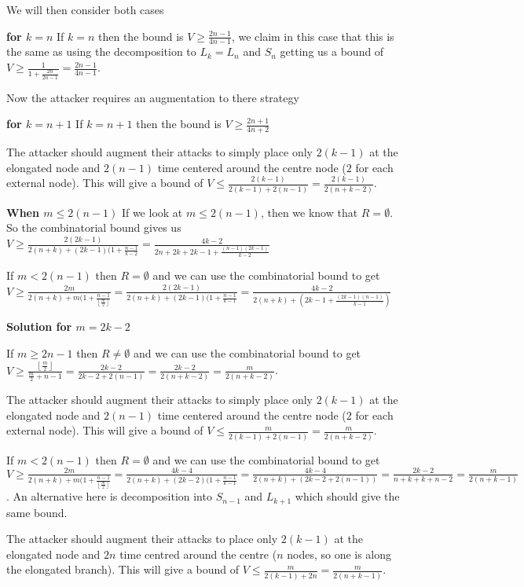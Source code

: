 \documentclass[a4paper,10pt]{article}
\newcommand{\floor}[1]{\left \lfloor #1 \right \rfloor}
\theoremstyle{definition}
\theoremstyle{definition}
\theoremstyle{remark}
\theoremstyle{definition}
\begin{document}
We will then consider both cases

\textbf{for $k=n$}
If $k=n$ then the bound is $V \geq \frac{2n-1}{4n-1}$, we claim in this case that this is the same as using the decomposition to $L_{k}=L_{n}$ and $S_{n}$ getting us a bound of $V \geq \frac{1}{1+\frac{2n}{2n-1}}=\frac{2n-1}{4n-1}$.

Now the attacker requires an augmentation to there strategy

\textbf{for $k=n+1$}
If $k=n+1$ then the bound is $V \geq \frac{2n+1}{4n+2}$

The attacker should augment their attacks to simply place only $2(k-1)$ at the elongated node and $2(n-1)$ time centered around the centre node ($2$ for each external node). This will give a bound of $V \leq \frac{2(k-1)}{2(k-1)+2(n-1)}=\frac{2(k-1)}{2(n+k-2)}$.


\textbf{When $m \leq 2(n-1)$}
If we look at $m \leq 2(n-1)$, then we know that $R = \emptyset$. So the combinatorial bound gives us $V \geq \frac{2(2k-1)}{2(n+k)+(2k-1)(1+\frac{n-1}{k-2}}=\frac{4k-2}{2n+2k+2k-1 + \frac{(n-1)(2k-1)}{k-2}}$


If $m < 2(n-1)$ then $R = \emptyset$ and we can use the combinatorial bound to get $V \geq \frac{2m}{2(n+k)+m(1+\frac{n-1}{\floor{\frac{m}{2}}}}=\frac{2(2k-1)}{2(n+k)+(2k-1)(1+\frac{n-1}{k-1}}=\frac{4k-2}{2(n+k)+(2k-1 +\frac{(2k-1)(n-1)}{k-1})}$


\textbf{Solution for $m=2k-2$} 

If $m \geq 2n-1$ then $R \neq \emptyset$ and we can use the combinatorial bound to get $V \geq \frac{\floor{\frac{m}{2}}}{\frac{m}{2}+n-1}=\frac{2k-2}{2k-2+2(n-1)}=\frac{2k-2}{2(n+k-2)}=\frac{m}{2(n+k-2)}$.

The attacker should augment their attacks to simply place only $2(k-1)$ at the elongated node and $2(n-1)$ time centered around the centre node ($2$ for each external node). This will give a bound of $V \leq \frac{m}{2(k-1)+2(n-1)}=\frac{m}{2(n+k-2)}$.


If $m < 2(n-1)$ then $R= \emptyset$ and we can use the combinatorial bound to get $V \geq \frac{2m}{2(n+k)+m(1+\frac{n-1}{\floor{\frac{m}{2}}}}=\frac{4k-4}{2(n+k)+(2k-2)(1+\frac{n-1}{k-1}}=\frac{4k-4}{2(n+k)+(2k-2+2(n-1))}=\frac{2k-2}{n+k+k+n-2}=\frac{m}{2(n+k-1)}$. An alternative here is decomposition into $S_{n-1}$ and $L_{k+1}$ which should give the same bound.

The attacker should augment their attacks to place only $2(k-1)$ at the elongated node and $2n$ time centred around the centre ($n$ nodes, so one is along the elongated branch). This will give a bound of $V \leq \frac{m}{2(k-1)+2n}=\frac{m}{2(n+k-1)}$.
\end{document}
